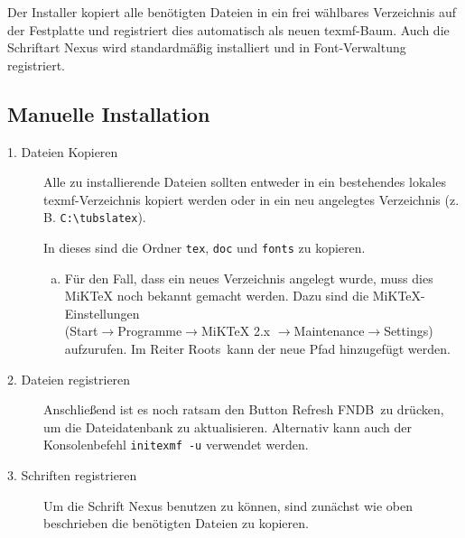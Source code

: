 Der Installer kopiert alle benötigten Dateien in ein frei wählbares Verzeichnis
auf der Festplatte und registriert dies automatisch als neuen texmf-Baum.
Auch die Schriftart Nexus wird standardmäßig installiert und in 
Font-Verwaltung registriert.




\subsection{Manuelle Installation}

\begin{description}
  \item[1. Dateien Kopieren]
  
    Alle zu installierende Dateien sollten entweder in ein bestehendes lokales
    texmf-Verzeichnis kopiert werden oder in ein neu angelegtes Verzeichnis
    (z.\,B. \lstinline{C:\tubslatex}).
    
    In dieses sind die Ordner \lstinline{tex}, \lstinline{doc} und 
    \lstinline{fonts} zu kopieren.
    
    \begin{enumerate}[a)]
      \item {\bfseries }
        
        Für den Fall, dass ein neues Verzeichnis angelegt wurde,
        muss dies MiKTeX noch bekannt gemacht werden.
        Dazu sind die MiKTeX-Einstellungen\\ (Start$\to$Programme$\to$MiKTeX 2.x 
        $\to$Maintenance$\to$Settings) aufzurufen.
        Im Reiter \glqq Roots\grqq\ kann der neue Pfad hinzugefügt werden.
    \end{enumerate}

  \item[2. Dateien registrieren]

    Anschließend ist es noch ratsam den Button \glqq Refresh FNDB\grqq\
    zu drücken, um die Dateidatenbank zu aktualisieren. Alternativ kann auch 
    der Konsolenbefehl \lstinline{initexmf -u} verwendet werden.

  \item[3. Schriften registrieren]
    Um die Schrift Nexus benutzen zu können, sind zunächst wie oben beschrieben
    die benötigten Dateien zu kopieren.


\end{description}
